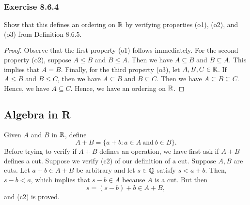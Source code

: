 \subsubsection{Exercise 8.6.4} Show that this defines an ordering on \( \mathbb{R}  \) by verifying properties (o1), (o2), and (o3) from Definition 8.6.5.
\begin{proof} 
    Observe that the first property (o1) follows immediately. For the second property (o2), suppose \( A \leq B  \) and \( B \leq A  \). Then we have \( A \subseteq B  \) and \( B \subseteq A  \). This implies that \( A = B  \). Finally, for the third property (o3), let \( A, B, C \in \mathbb{R}   \). If \( A \leq B  \) and \( B \leq C \), then we have \( A \subseteq B  \) and \( B \subseteq C  \). Then we have \( A \subseteq B \subseteq C  \). Hence, we have \( A \subseteq C \). Hence, we have an ordering on \( \mathbb{R}  \).
\end{proof}


\subsection{Algebra in R}

Given \( A  \) and \( B  \) in \( \mathbb{R}  \), define 
\[  A +  B = \{ a + b : a \in A \ \text{and} \ b \in B  \}. \] Before trying to verify if \( A + B  \) defines an operation, we have first ask if \( A + B  \) defines a cut. Suppose we verify (c2) of our definition of a cut. Suppose \( A, B  \) are cuts. Let \( a + b \in A + B  \) be arbitrary and let \( s \in \mathbb{Q}  \) satisfy \( s < a + b \). Then, \( s - b < a  \), which implies that \( s - b \in A  \) because \( A  \) is a cut. But then 
\[  s = (s-b) + b \in A + B,  \] and (c2) is proved.

